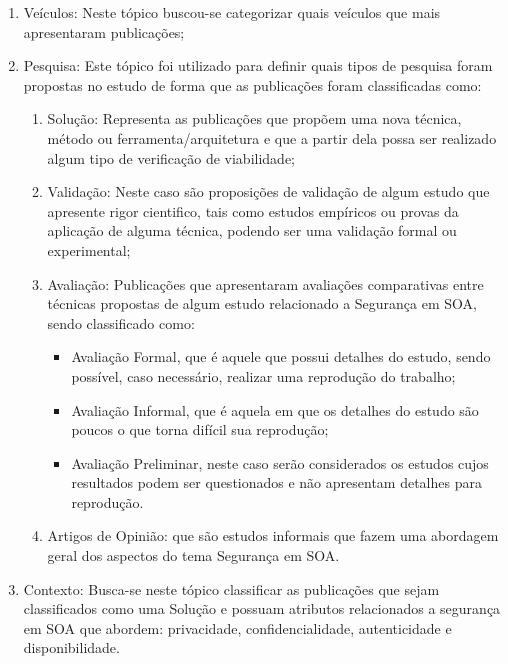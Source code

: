 \begin{enumerate}
            \item Veículos: Neste tópico buscou-se categorizar quais veículos que mais apresentaram publicações;
            \item Pesquisa: Este tópico foi utilizado para definir quais tipos de pesquisa foram propostas no estudo de forma que as publicações foram classificadas como:
                \begin{enumerate}[ a )]
                 \item Solução: Representa as publicações que propõem uma nova técnica, método ou ferramenta/arquitetura e que a partir dela possa ser realizado algum tipo de verificação de viabilidade;

                 \item Validação: Neste caso são proposições de validação de algum estudo que apresente rigor cientifico, tais como estudos empíricos ou provas da aplicação de alguma técnica, podendo ser uma validação formal ou experimental;

                 \item Avaliação: Publicações que apresentaram avaliações comparativas entre técnicas propostas de algum estudo relacionado a Segurança em SOA, sendo  classificado como:

                    \begin{itemize}
                         \item Avaliação Formal, que é aquele que possui detalhes do estudo, sendo possível, caso necessário, realizar uma reprodução do trabalho;

                        \item Avaliação Informal, que é  aquela em que os detalhes do estudo são poucos o que torna difícil sua reprodução;

                        \item Avaliação Preliminar, neste caso serão considerados os estudos cujos resultados podem ser questionados e não apresentam detalhes para reprodução.
                    \end{itemize}


                 \item Artigos de Opinião: que são estudos informais que fazem uma abordagem geral dos aspectos do tema Segurança em SOA.

            \end{enumerate}

            \item Contexto: Busca-se neste tópico classificar as publicações que sejam classificados como uma Solução e possuam atributos  relacionados a segurança em SOA que abordem: privacidade, confidencialidade, autenticidade e disponibilidade.

\end{enumerate}

